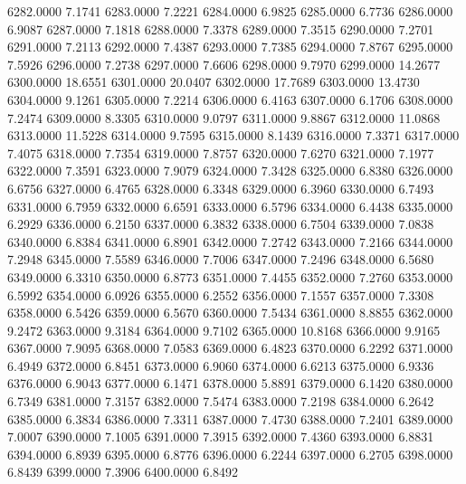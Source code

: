 6282.0000      7.1741
6283.0000      7.2221
6284.0000      6.9825
6285.0000      6.7736
6286.0000      6.9087
6287.0000      7.1818
6288.0000      7.3378
6289.0000      7.3515
6290.0000      7.2701
6291.0000      7.2113
6292.0000      7.4387
6293.0000      7.7385
6294.0000      7.8767
6295.0000      7.5926
6296.0000      7.2738
6297.0000      7.6606
6298.0000      9.7970
6299.0000     14.2677
6300.0000     18.6551
6301.0000     20.0407
6302.0000     17.7689
6303.0000     13.4730
6304.0000      9.1261
6305.0000      7.2214
6306.0000      6.4163
6307.0000      6.1706
6308.0000      7.2474
6309.0000      8.3305
6310.0000      9.0797
6311.0000      9.8867
6312.0000     11.0868
6313.0000     11.5228
6314.0000      9.7595
6315.0000      8.1439
6316.0000      7.3371
6317.0000      7.4075
6318.0000      7.7354
6319.0000      7.8757
6320.0000      7.6270
6321.0000      7.1977
6322.0000      7.3591
6323.0000      7.9079
6324.0000      7.3428
6325.0000      6.8380
6326.0000      6.6756
6327.0000      6.4765
6328.0000      6.3348
6329.0000      6.3960
6330.0000      6.7493
6331.0000      6.7959
6332.0000      6.6591
6333.0000      6.5796
6334.0000      6.4438
6335.0000      6.2929
6336.0000      6.2150
6337.0000      6.3832
6338.0000      6.7504
6339.0000      7.0838
6340.0000      6.8384
6341.0000      6.8901
6342.0000      7.2742
6343.0000      7.2166
6344.0000      7.2948
6345.0000      7.5589
6346.0000      7.7006
6347.0000      7.2496
6348.0000      6.5680
6349.0000      6.3310
6350.0000      6.8773
6351.0000      7.4455
6352.0000      7.2760
6353.0000      6.5992
6354.0000      6.0926
6355.0000      6.2552
6356.0000      7.1557
6357.0000      7.3308
6358.0000      6.5426
6359.0000      6.5670
6360.0000      7.5434
6361.0000      8.8855
6362.0000      9.2472
6363.0000      9.3184
6364.0000      9.7102
6365.0000     10.8168
6366.0000      9.9165
6367.0000      7.9095
6368.0000      7.0583
6369.0000      6.4823
6370.0000      6.2292
6371.0000      6.4949
6372.0000      6.8451
6373.0000      6.9060
6374.0000      6.6213
6375.0000      6.9336
6376.0000      6.9043
6377.0000      6.1471
6378.0000      5.8891
6379.0000      6.1420
6380.0000      6.7349
6381.0000      7.3157
6382.0000      7.5474
6383.0000      7.2198
6384.0000      6.2642
6385.0000      6.3834
6386.0000      7.3311
6387.0000      7.4730
6388.0000      7.2401
6389.0000      7.0007
6390.0000      7.1005
6391.0000      7.3915
6392.0000      7.4360
6393.0000      6.8831
6394.0000      6.8939
6395.0000      6.8776
6396.0000      6.2244
6397.0000      6.2705
6398.0000      6.8439
6399.0000      7.3906
6400.0000      6.8492

